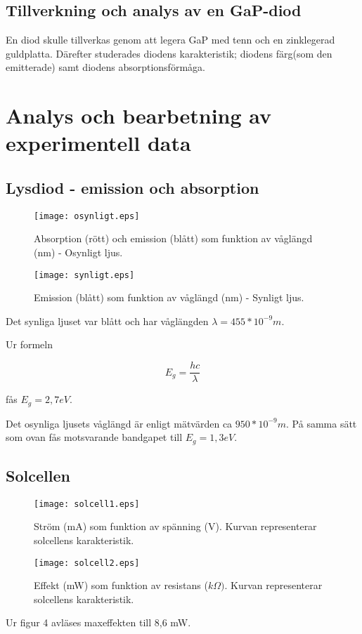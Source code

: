\subsection{Tillverkning och analys av en GaP-diod}
En diod skulle tillverkas genom att legera GaP med tenn och en zinklegerad guldplatta. Därefter studerades diodens karakteristik; diodens färg(som den emitterade) samt diodens absorptionsförmåga.

\pagebreak
\section{Analys och bearbetning av experimentell data}
\subsection{Lysdiod - emission och absorption}
\begin{figure}[htb]
\centering
\texttt{[image: osynligt.eps]}
\caption{Absorption (rött) och emission (blått) som funktion av våglängd (nm) - Osynligt ljus.}
\end{figure} 

\begin{figure}[htb]
\centering
\texttt{[image: synligt.eps]}
\caption{Emission (blått) som funktion av våglängd (nm) - Synligt ljus.}
\end{figure} 

Det synliga ljuset var blått och har våglängden 
\begin{math} \lambda = 455*10^{-9} m.
\end{math}

Ur formeln 

\begin{equation}
E_{g}= \frac {hc}{\lambda} \label{ekv1} 
\end{equation}

fås $E_{g}=2,7eV$.

Det osynliga ljusets våglängd är enligt mätvärden ca $950*10^{-9}m$.
På samma sätt som ovan fås motsvarande bandgapet till $E_{g}=1,3 eV$.


\subsection{Solcellen}
\begin{figure}[htb]
\centering
\texttt{[image: solcell1.eps]}
\caption{Ström (mA) som funktion av spänning (V). Kurvan representerar solcellens karakteristik.}
\end{figure} 
\begin{figure}[htb]
\centering
\texttt{[image: solcell2.eps]}
\caption{Effekt (mW) som funktion av resistans ($k\Omega)$. Kurvan representerar solcellens karakteristik.}
\end{figure} 
Ur figur 4 avläses maxeffekten till 8,6 mW.

